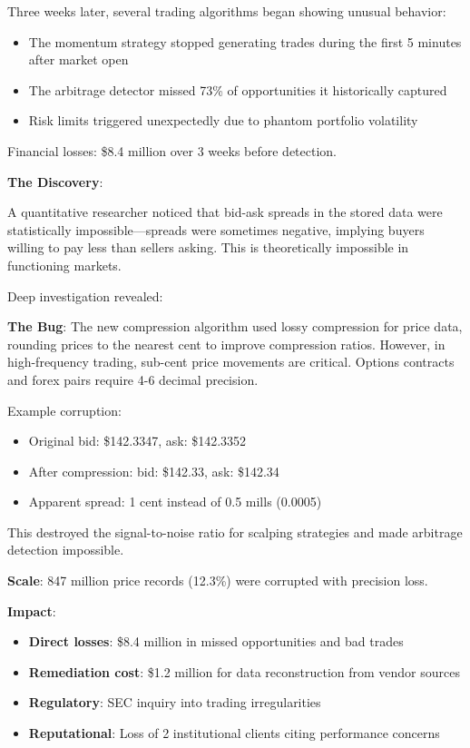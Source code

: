 Three weeks later, several trading algorithms began showing unusual behavior:
\begin{itemize}
    \item The momentum strategy stopped generating trades during the first 5 minutes after market open
    \item The arbitrage detector missed 73\% of opportunities it historically captured
    \item Risk limits triggered unexpectedly due to phantom portfolio volatility
\end{itemize}

Financial losses: \$8.4 million over 3 weeks before detection.

\textbf{The Discovery}:

A quantitative researcher noticed that bid-ask spreads in the stored data were statistically impossible---spreads were sometimes negative, implying buyers willing to pay less than sellers asking. This is theoretically impossible in functioning markets.

Deep investigation revealed:

\textbf{The Bug}: The new compression algorithm used lossy compression for price data, rounding prices to the nearest cent to improve compression ratios. However, in high-frequency trading, sub-cent price movements are critical. Options contracts and forex pairs require 4-6 decimal precision.

Example corruption:
\begin{itemize}
    \item Original bid: \$142.3347, ask: \$142.3352
    \item After compression: bid: \$142.33, ask: \$142.34
    \item Apparent spread: 1 cent instead of 0.5 mills (0.0005)
\end{itemize}

This destroyed the signal-to-noise ratio for scalping strategies and made arbitrage detection impossible.

\textbf{Scale}: 847 million price records (12.3\%) were corrupted with precision loss.

\textbf{Impact}:
\begin{itemize}
    \item \textbf{Direct losses}: \$8.4 million in missed opportunities and bad trades
    \item \textbf{Remediation cost}: \$1.2 million for data reconstruction from vendor sources
    \item \textbf{Regulatory}: SEC inquiry into trading irregularities
    \item \textbf{Reputational}: Loss of 2 institutional clients citing performance concerns
\end{itemize}

